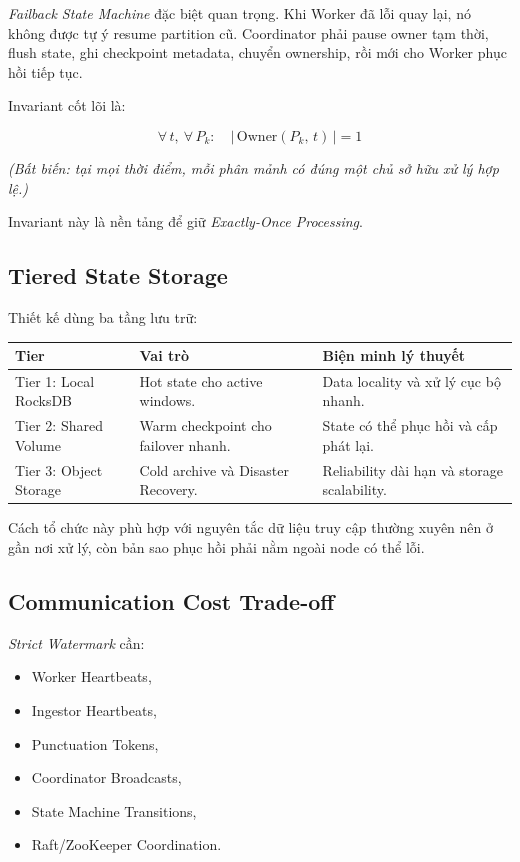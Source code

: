 \documentclass[12pt,a4paper]{article}
\begin{document}
\textit{Failback State Machine} đặc biệt quan trọng. Khi Worker đã lỗi quay lại, nó không được tự ý resume partition cũ. Coordinator phải pause owner tạm thời, flush state, ghi checkpoint metadata, chuyển ownership, rồi mới cho Worker phục hồi tiếp tục.

Invariant cốt lõi là:

{\large
\begin{equation*}
    \boxed{\forall\, t,\ \forall\, P_k : \quad \big|\,\mathrm{Owner}(P_k,\, t)\,\big| = 1}
\end{equation*}
}
\begin{center}
    \small\textit{(Bất biến: tại mọi thời điểm, mỗi phân mảnh có đúng một chủ sở hữu xử lý hợp lệ.)}
\end{center}

Invariant này là nền tảng để giữ \textit{Exactly-Once Processing}.

\subsection{Tiered State Storage}

Thiết kế dùng ba tầng lưu trữ:

\begin{longtable}{p{} p{} p{}}
\toprule
\textbf{Tier} & \textbf{Vai trò} & \textbf{Biện minh lý thuyết} \\
\midrule
\endhead
Tier 1: Local RocksDB & Hot state cho active windows. & Data locality và xử lý cục bộ nhanh. \\
Tier 2: Shared Volume & Warm checkpoint cho failover nhanh. & State có thể phục hồi và cấp phát lại. \\
Tier 3: Object Storage & Cold archive và Disaster Recovery. & Reliability dài hạn và storage scalability. \\
\bottomrule
\end{longtable}

Cách tổ chức này phù hợp với nguyên tắc dữ liệu truy cập thường xuyên nên ở gần nơi xử lý, còn bản sao phục hồi phải nằm ngoài node có thể lỗi.

\subsection{Communication Cost Trade-off}

\textit{Strict Watermark} cần:

\begin{itemize}
    \item Worker Heartbeats,
    \item Ingestor Heartbeats,
    \item Punctuation Tokens,
    \item Coordinator Broadcasts,
    \item State Machine Transitions,
    \item Raft/ZooKeeper Coordination.
\end{itemize}
\end{document}
